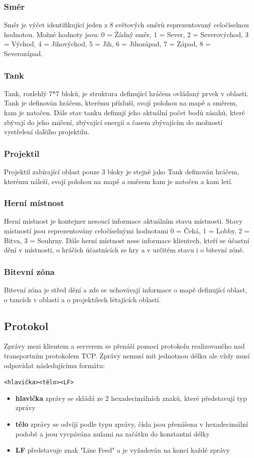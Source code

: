 \documentclass[12pt,a4paper]{article}
\begin{document}
\subsubsection*{Směr}
Směr je výčet identifikující jeden z 8 světových směrů reprezentovaný celočíselnou hodnotou. Možné hodnoty jsou: 0 = Žádný směr, 1 = Sever, 2 = Severovýchod, 3 = Východ, 4 = Jihovýchod, 5 = Jih, 6 = Jihozápad, 7 = Západ, 8 = Severozápad.
\subsubsection*{Tank}
Tank, rozlehlý 7*7 bloků, je struktura definující hráčem ovládaný prvek v oblasti. Tank je definován hráčem, kterému přísluší, svojí polohou na mapě a směrem, kam je natočen. Dále stav tanku definují jeho aktuální počet bodů zásahů, které zbývají do jeho zničení, zbývající energií a časem zbývajícím do možností vystřelení dalšího projektilu.
\subsubsection*{Projektil}
Projektil zabírající oblast pouze 3 bloky je stejně jako Tank definován hráčem, kterému náleží, svojí polohou na mapě a směrem kam je natočen a kam letí.
\subsubsection{Herní místnost}
Herní místnost je kontejner nesoucí informace aktuálním stavu místnosti. Stavy místností jsou reprezentovány celočíselnými hodnotami 0 = Čeká, 1 = Lobby, 2 = Bitva, 3 = Souhrny. Dále herní místnost nese informace klientech, kteří se účastní dění v místnosti, o hráčích účastnících se hry a v určitém stavu i o bitevní zóně.
\subsubsection*{Bitevní zóna}
Bitevní zóna je střed dění a zde se uchovávají informace o mapě definující oblast, o tancích v oblasti a o projektilech létajících oblastí.


\newpage
\subsection{Protokol}
Zprávy mezi klientem a serverem se přenáší pomocí protokolu realizovaného nad transportním protokolem TCP. Zprávy nemusí mít jednotnou délku ale vždy musí odpovídat následujícímu formátu:
\begin{center}
\texttt{<hlavička><tělo><LF>}
\end{center}
\begin{itemize}
\setlength\itemsep{0em}
\item \textbf{hlavička} zprávy se skládá ze 2 hexadecimálních znaků, které představují typ zprávy
\item \textbf{tělo} zprávy se odvíjí podle typu zprávy, čísla jsou přenášena v hexadecimální podobě a jsou vycpávána nulami na začátku do konstantní délky
\item \textbf{LF} představuje znak "Line Feed" a je vyžadován na konci každé zprávy
\end{itemize}
\end{document}

